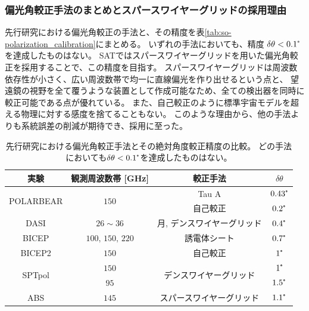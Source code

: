\documentclass[../../main.tex]{subfiles}
\begin{document}
\subsubsection{偏光角較正手法のまとめとスパースワイヤーグリッドの採用理由}
先行研究における偏光角較正の手法と、その精度を表\ref{tab:so-polarization_calibration}にまとめる。
いずれの手法においても、精度 $\delta\theta < 0.1\tcdegree$ を達成したものはない。
SATではスパースワイヤーグリッドを用いた偏光角較正を採用することで、この精度を目指す。
スパースワイヤーグリッドは周波数依存性が小さく、広い周波数帯で均一に直線偏光を作り出せるという点と、
望遠鏡の視野を全て覆うような装置として作成可能なため、全ての検出器を同時に較正可能である点が優れている。
また、自己較正のように標準宇宙モデルを超える物理に対する感度を捨てることもない。
このような理由から、他の手法よりも系統誤差の削減が期待でき、採用に至った。
\begin{table}[H]
    \centering
    \caption[先行研究における偏光角較正手法とその精度の比較]{先行研究における偏光角較正手法とその絶対角度較正精度の比較。
    どの手法においても$\delta\theta < 0.1\tcdegree$を達成したものはない。}
    \begin{tabular}{cccc}
        \hline
        実験 & 観測周波数帯 [GHz] & 較正手法 & $\delta\theta$ \\
        \hline
        \hline
        \multirow{2}{*}{POLARBEAR\cite{so:polarbear_cal}} & \multirow{2}{*}{$150$} & Tau A & $0.43\tcdegree$ \\
                                                          &                        & 自己較正\footnotemark[1] & $0.2\tcdegree$ \\
        \hline
        DASI\cite{so:Leitch_2002} & $26\sim36$ & 月, デンスワイヤーグリッド & $0.4\tcdegree$ \\
        \hline
        BICEP\cite{so:Takahashi_2008} & $100,\,150,\,220$ & 誘電体シート & $0.7\tcdegree$ \\
        \hline
        BICEP2\cite{so:bicep2_syserr} & $150$ & 自己較正\footnotemark[1] & $1\tcdegree$\\
        \hline
        \multirow{2}{*}{SPTpol\cite{so:Hanson_2013}} & $150$ & \multirow{2}{*}{デンスワイヤーグリッド} & $1\tcdegree$ \\
                                                     & $95$  & & $1.5\tcdegree$ \\
        \hline
        \multirow{3}{*}{ABS\cite{so:Kusaka_2018}} & \multirow{3}{*}{$145$} & スパースワイヤーグリッド & $1.1\tcdegree$ \\

\end{tabular}
\end{table}
\end{document}
